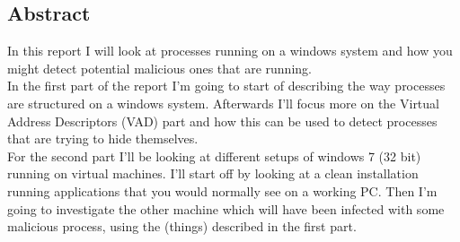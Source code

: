 \documentclass[a4paper]{article}
\author{Kristian Hougaard Olsen \inst{1}}
\begin{document}
\subsection*{Abstract}
%
In this report I will look at processes running on a windows system and how you might detect potential malicious ones that are running. \\
%
In the first part of the report I’m going to start of describing the way processes are structured on a windows system. Afterwards I’ll focus more on the Virtual Address Descriptors (VAD) part and how this can be used to detect processes that are trying to hide themselves. \\
%
%
For the second part I’ll be looking at different setups of windows 7 (32 bit) running on virtual machines. I’ll start off by looking at a clean installation running applications that you would normally see on a working PC. Then I’m going to investigate the other machine which will have been infected with some malicious process, using the (things) described in the first part. \\
%
% 



\newpage
\end{document}
